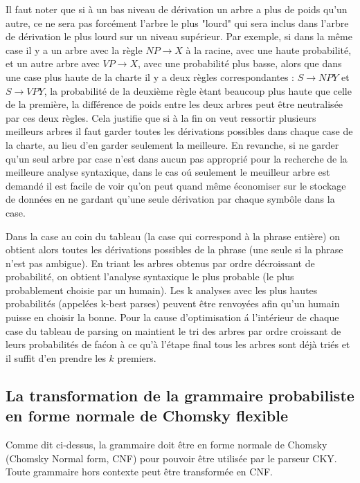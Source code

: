 \documentclass[12pt]{article}
\begin{document}
Il faut noter que si \`a un bas niveau de
d\'erivation un arbre a plus de poids qu'un autre, ce ne sera pas forc\'ement
l'arbre le plus "lourd"  qui sera inclus dans l'arbre de d\'erivation le plus
lourd sur un niveau sup\'erieur. Par exemple, si dans la m\^eme case il y a un arbre
avec la r\`egle $NP \rightarrow X$ \`a la racine, avec une haute probabilit\'e, et un
autre arbre avec $VP \rightarrow X$, avec une probabilit\'e plus basse, alors que
dans une case plus haute de la charte il y a deux r\`egles correspondantes : $S
\rightarrow NP Y$ et $S \rightarrow VP Y$, la probabilit\'e de la deuxi\`eme r\`egle
\`etant beaucoup plus haute que celle de la premi\`ere, la diff\'erence de poids entre
les deux arbres peut \^etre neutralis\'ee par ces deux r\`egles. Cela justifie 
que si \`a la fin on veut ressortir plusieurs meilleurs arbres il
faut garder toutes les d\'erivations possibles dans chaque case de la charte, au
lieu d'en garder seulement la meilleure. En revanche, si ne garder qu'un seul arbre par case n'est 
 dans aucun pas appropri\'e pour la recherche de la meilleure analyse syntaxique,
 dans le cas o\'u seulement le meuilleur arbre est demand\'e 
 il est facile de voir qu'on peut quand m\^eme \'economiser sur le stockage de donn\'ees
 en ne gardant qu'une seule d\'erivation par chaque symb\^ole dans la case. \par

Dans la case au coin du tableau (la case qui correspond \`a la phrase enti\`ere) on
obtient alors toutes les d\'erivations possibles de la phrase (une seule si la
phrase n'est pas ambigue). En triant les arbres obtenus par ordre d\'ecroissant de
probabilit\'e, on obtient l'analyse syntaxique le plus probable (le plus
probablement choisie par un humain). Les k analyses avec les plus hautes
probabilit\'es (appel\'ees k-best parses) peuvent \^etre renvoy\'ees afin qu'un humain
puisse en choisir la bonne. Pour la cause d'optimisation \'a l'int\'erieur de chaque case
du tableau de parsing on maintient le tri des arbres par ordre croissant de leurs probabilit\'es
de fa\'con \`a ce qu'\`a l'\'etape final tous les arbres sont d\'ej\`a tri\'es et il suffit d'en prendre 
les $k$ premiers.


\subsection{La transformation de la grammaire probabiliste en forme normale de Chomsky flexible}

Comme dit ci-dessus, la grammaire doit \^etre en forme normale de Chomsky
(Chomsky Normal form, CNF) pour pouvoir \^etre utilis\'ee par le parseur CKY. Toute
grammaire hors contexte peut \^etre transform\'ee en CNF. \par
\end{document}
